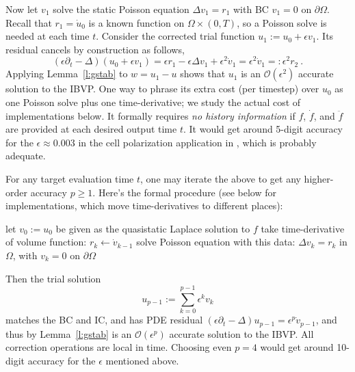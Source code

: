 \documentclass[10pt]{article}
\newcommand{\be}{\begin{equation}}
\newcommand{\ee}{\end{equation}}
\newcommand{\bigO}{{\mathcal O}}
\newcommand{\pO}{{\partial\Omega}}
\newcommand{\eps}{\epsilon}
\newcommand{\dt}{\partial_t}
\begin{document}
Now let $v_1$ solve the static Poisson equation $\Delta v_1 = r_1$ with
BC $v_1=0$ on $\pO$. Recall that $r_1=\dot u_0$ is a known function
on $\Omega \times (0,T)$, so a Poisson solve is needed at each time $t$.
Consider the corrected trial function
$u_1 := u_0 + \eps v_1$. Its residual cancels by construction as follows,
$$
(\eps\dt-\Delta)(u_0 +\eps v_1) = \eps r_1 - \eps \Delta v_1 +\eps^2 \dot v_1 =
\eps^2 \dot v_1 =: \eps^2 r_2~.
$$
Applying Lemma~\ref{l:gstab} to $w = u_1-u$
shows that $u_1$ is an $\bigO(\eps^2)$ accurate solution
to the IBVP.
One way to phrase its extra cost (per timestep) over $u_0$ as
one Poisson solve plus one time-derivative;
we study the actual cost of implementations below.
It formally requires {\em no history information} if $f$, $\dot f$, and
$\ddot f$ are provided at each desired output time $t$.
It would get around 5-digit accuracy for the
$\eps\approx 0.003$ in the cell polarization application in \cite{diegmiller18},
which is probably adequate.

For any target evaluation time $t$, one may iterate the above
to get any higher-order accuracy $p\ge1$. Here's the formal procedure
(see below for implementations, which move time-derivatives to different
places):

\vspace{1ex}
\colorbox[rgb]{0.9,0.9,0.9}{%
\begin{minipage}{0.9\textwidth}
\begin{algorithmic}
  \STATE let $v_0 := u_0$ be given as the quasistatic Laplace solution to $f$
  \STATE take time-derivative of volume function: \; $r_{k} \gets \dot v_{k-1}$
  \STATE solve Poisson equation with this data: \;\;\; $\Delta v_k = r_k$ in $\Omega$, with $v_k=0$ on $\pO$
  \ENDFOR
\end{algorithmic}
\end{minipage}
}%
\vspace{1ex}

Then the trial solution
\be
u_{p-1} := \sum_{k=0}^{p-1} \eps^k v_k
\label{up}
\ee
matches the BC and IC, and has PDE
residual $(\eps\dt-\Delta)u_{p-1} = \eps^p \dot v_{p-1}$,
and thus by Lemma~\ref{l:gstab} is an $\bigO(\eps^p)$ accurate solution
to the IBVP.
All correction operations are local in time.
Choosing even $p=4$ would get around 10-digit accuracy for the $\eps$
mentioned above.
\end{document}
